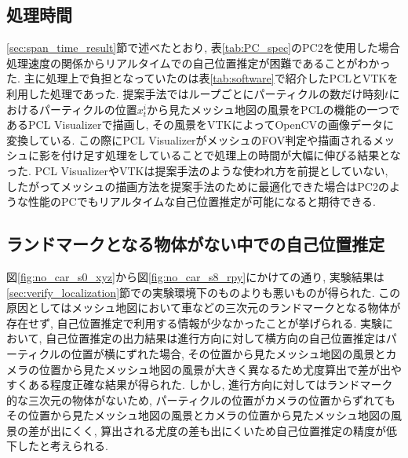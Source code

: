 \subsection{処理時間}
\ref{sec:span_time_result}節で述べたとおり, 表\ref{tab:PC_spec}のPC2を使用した場合処理速度の関係からリアルタイムでの自己位置推定が困難であることがわかった. 主に処理上で負担となっていたのは表\ref{tab:software}で紹介したPCLとVTKを利用した処理であった. 提案手法ではループごとにパーティクルの数だけ時刻$t$におけるパーティクルの位置$x_{t}^{i}$から見たメッシュ地図の風景をPCLの機能の一つであるPCL Visualizerで描画し, その風景をVTKによってOpenCVの画像データに変換している. この際にPCL VisualizerがメッシュのFOV判定や描画されるメッシュに影を付け足す処理をしていることで処理上の時間が大幅に伸びる結果となった. PCL VisualizerやVTKは提案手法のような使われ方を前提としていない, したがってメッシュの描画方法を提案手法のために最適化できた場合はPC2のような性能のPCでもリアルタイムな自己位置推定が可能になると期待できる.

\subsection{ランドマークとなる物体がない中での自己位置推定}\label{sec:considerarion_no_car}
図\ref{fig:no_car_s0_xyz}から図\ref{fig:no_car_s8_rpy}にかけての通り, 実験結果は\ref{sec:verify_localization}節での実験環境下のものよりも悪いものが得られた. この原因としてはメッシュ地図において車などの三次元のランドマークとなる物体が存在せず, 自己位置推定で利用する情報が少なかったことが挙げられる. 実験において, 自己位置推定の出力結果は進行方向に対して横方向の自己位置推定はパーティクルの位置が横にずれた場合, その位置から見たメッシュ地図の風景とカメラの位置から見たメッシュ地図の風景が大きく異なるため尤度算出で差が出やすくある程度正確な結果が得られた. しかし, 進行方向に対してはランドマーク的な三次元の物体がないため, パーティクルの位置がカメラの位置からずれてもその位置から見たメッシュ地図の風景とカメラの位置から見たメッシュ地図の風景の差が出にくく, 算出される尤度の差も出にくいため自己位置推定の精度が低下したと考えられる.